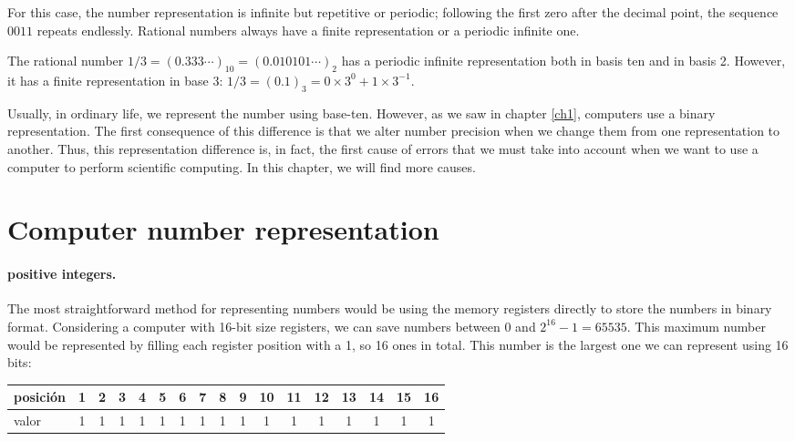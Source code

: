 \begin{paracol}{2}
\switchcolumn
For this case, the number representation is infinite but repetitive or periodic; following the first zero after the decimal point, the sequence $0011$ repeats endlessly.
Rational numbers always have a finite representation or a periodic infinite one.

The rational number $1/3=(0.333\cdots)_{10} = (0.010101\cdots)_2$ has a periodic infinite representation both in basis ten and in basis 2. However, it has a finite representation in base 3: $1/3=(0.1)_{3}= 0 \times 3^0 + 1\times 3^{-1}$.

Usually, in ordinary life, we represent the number using base-ten. However, as we saw in chapter \ref{ch1}, computers use a binary representation. The first consequence of this difference is that we alter number precision when we change them from one representation to another. Thus, this representation difference is, in fact, the first cause of errors that we must take into account when we want to use a computer to perform scientific computing. In this chapter, we will find more causes.

\section{Computer number representation}
\paragraph{positive integers.} The most straightforward method for representing numbers would be using the memory registers directly to store the numbers in binary format. Considering a computer with 16-bit size registers, we can save numbers between 0 and $2^{16}-1=65535$. This maximum number would be represented by filling each register position with a 1, so 16 ones in total. This number is the largest one we can represent using 16 bits:
\end{paracol}

\begin{tabular}{|l|c|c|c|c|c|c|c|c|c|c|c|c|c|c|c|c|}
\hline
posición&1&2&3&4&5&6&7&8&9&10&11&12&13&14&15&16  \\
\hline
valor&1&1&1&1&1&1&1&1&1&1&1&1&1&1&1&1 \\
\hline
\end{tabular}\\

